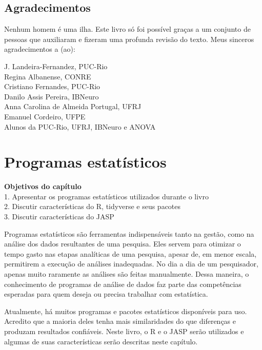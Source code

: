 \documentclass[
]{book}
\newenvironment{objectives}{
  \definecolor{shadecolor}{rgb}{0, 0, 0}  %
  \color{white}
  \begin{shaded}}
 {\end{shaded}}
\begin{document}
\hypertarget{agradecimentos}{%
\section{Agradecimentos}\label{agradecimentos}}

Nenhum homem é uma ilha. Este livro só foi possível graças a um conjunto de pessoas que auxiliaram e fizeram uma profunda revisão do texto. Meus sinceros agradecimentos a (ao):

J. Landeira-Fernandez, PUC-Rio\\
Regina Albanense, CONRE\\
Cristiano Fernandes, PUC-Rio\\
Danilo Assis Pereira, IBNeuro\\
Anna Carolina de Almeida Portugal, UFRJ\\
Emanuel Cordeiro, UFPE\\
Alunos da PUC-Rio, UFRJ, IBNeuro e ANOVA

\hypertarget{programas-estatuxedsticos}{%
\chapter{Programas estatísticos}\label{programas-estatuxedsticos}}

\begin{objectives}

\textbf{Objetivos do capítulo}\\
1. Apresentar os programas estatísticos utilizados durante o livro\\
2. Discutir características do R, tidyverse e seus pacotes\\
3. Discutir características do JASP

\end{objectives}

Programas estatísticos são ferramentas indispensáveis tanto na gestão, como na análise dos dados resultantes de uma pesquisa. Eles servem para otimizar o tempo gasto nas etapas analíticas de uma pesquisa, apesar de, em menor escala, permitirem a execução de análises inadequadas. No dia a dia de um pesquisador, apenas muito raramente as análises são feitas manualmente. Dessa maneira, o conhecimento de programas de análise de dados faz parte das competências esperadas para quem deseja ou precisa trabalhar com estatística.

Atualmente, há muitos programas e pacotes estatísticos disponíveis para uso. Acredito que a maioria deles tenha mais similaridades do que diferenças e produzam resultados confiáveis. Neste livro, o R e o JASP serão utilizados e algumas de suas características serão descritas neste capítulo.
\end{document}
